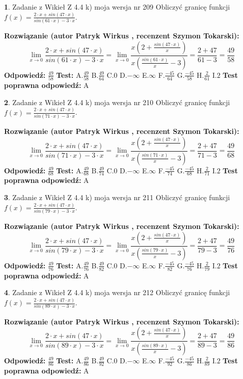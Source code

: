 \documentclass[12pt, a4paper]{article}
\theoremstyle{definition} %
\newtheorem{zad}{}
\newcommand{\zadStart}[1]{\begin{zad}#1\newline}
\newcommand{\zadStop}{\end{zad}}
\newcommand{\rozwStart}[2]{\noindent \textbf{Rozwiązanie (autor #1 , recenzent #2): }\newline}
\newcommand{\rozwStop}{\newline}
\newcommand{\odpStart}{\noindent \textbf{Odpowiedź:}\newline}
\newcommand{\odpStop}{\newline}
\newcommand{\testStart}{\noindent \textbf{Test:}\newline}
\newcommand{\testStop}{\newline}
\newcommand{\kluczStart}{\noindent \textbf{Test poprawna odpowiedź:}\newline}
\newcommand{\kluczStop}{\newline}
\begin{document}
\zadStart{Zadanie z Wikieł Z 4.4 k) moja wersja nr 209}
Obliczyć granicę funkcji $f(x)=\frac{2\cdot x +sin(47\cdot x)}{sin(61\cdot x) -3\cdot x}$.
\zadStop
\rozwStart{Patryk Wirkus}{Szymon Tokarski}
$$\lim\limits_{x\to 0}\frac{2\cdot x +sin(47\cdot x)}{sin(61\cdot x) -3\cdot x}
=\lim\limits_{x\to 0}\frac{x(2+\frac{sin(47\cdot x)}{x})}{x(\frac{sin(61\cdot x)}{x}-3)}
=\frac{2+47}{61-3} = \frac{49}{58}$$
\rozwStop
\odpStart
$\frac{49}{58}$
\odpStop
\testStart
A.$\frac{49}{58}$
B.$\frac{49}{64}$
C.$0$
D.$-\infty$
E.$\infty$
F.$\frac{-45}{64}$
G.$\frac{-45}{58}$
H.$\frac{2}{61}$
I.$2$
\testStop
\kluczStart
A
\kluczStop



\zadStart{Zadanie z Wikieł Z 4.4 k) moja wersja nr 210}
Obliczyć granicę funkcji $f(x)=\frac{2\cdot x +sin(47\cdot x)}{sin(71\cdot x) -3\cdot x}$.
\zadStop
\rozwStart{Patryk Wirkus}{Szymon Tokarski}
$$\lim\limits_{x\to 0}\frac{2\cdot x +sin(47\cdot x)}{sin(71\cdot x) -3\cdot x}
=\lim\limits_{x\to 0}\frac{x(2+\frac{sin(47\cdot x)}{x})}{x(\frac{sin(71\cdot x)}{x}-3)}
=\frac{2+47}{71-3} = \frac{49}{68}$$
\rozwStop
\odpStart
$\frac{49}{68}$
\odpStop
\testStart
A.$\frac{49}{68}$
B.$\frac{49}{74}$
C.$0$
D.$-\infty$
E.$\infty$
F.$\frac{-45}{74}$
G.$\frac{-45}{68}$
H.$\frac{2}{71}$
I.$2$
\testStop
\kluczStart
A
\kluczStop



\zadStart{Zadanie z Wikieł Z 4.4 k) moja wersja nr 211}
Obliczyć granicę funkcji $f(x)=\frac{2\cdot x +sin(47\cdot x)}{sin(79\cdot x) -3\cdot x}$.
\zadStop
\rozwStart{Patryk Wirkus}{Szymon Tokarski}
$$\lim\limits_{x\to 0}\frac{2\cdot x +sin(47\cdot x)}{sin(79\cdot x) -3\cdot x}
=\lim\limits_{x\to 0}\frac{x(2+\frac{sin(47\cdot x)}{x})}{x(\frac{sin(79\cdot x)}{x}-3)}
=\frac{2+47}{79-3} = \frac{49}{76}$$
\rozwStop
\odpStart
$\frac{49}{76}$
\odpStop
\testStart
A.$\frac{49}{76}$
B.$\frac{49}{82}$
C.$0$
D.$-\infty$
E.$\infty$
F.$\frac{-45}{82}$
G.$\frac{-45}{76}$
H.$\frac{2}{79}$
I.$2$
\testStop
\kluczStart
A
\kluczStop



\zadStart{Zadanie z Wikieł Z 4.4 k) moja wersja nr 212}
Obliczyć granicę funkcji $f(x)=\frac{2\cdot x +sin(47\cdot x)}{sin(89\cdot x) -3\cdot x}$.
\zadStop
\rozwStart{Patryk Wirkus}{Szymon Tokarski}
$$\lim\limits_{x\to 0}\frac{2\cdot x +sin(47\cdot x)}{sin(89\cdot x) -3\cdot x}
=\lim\limits_{x\to 0}\frac{x(2+\frac{sin(47\cdot x)}{x})}{x(\frac{sin(89\cdot x)}{x}-3)}
=\frac{2+47}{89-3} = \frac{49}{86}$$
\rozwStop
\odpStart
$\frac{49}{86}$
\odpStop
\testStart
A.$\frac{49}{86}$
B.$\frac{49}{92}$
C.$0$
D.$-\infty$
E.$\infty$
F.$\frac{-45}{92}$
G.$\frac{-45}{86}$
H.$\frac{2}{89}$
I.$2$
\testStop
\kluczStart
A
\kluczStop
\end{document}
